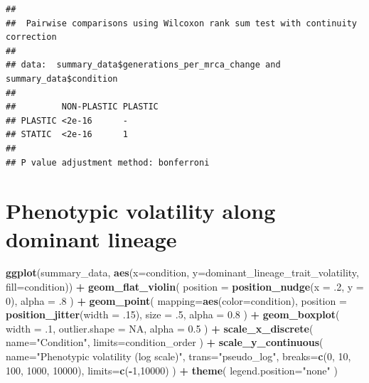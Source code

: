 \documentclass[]{book}
\newenvironment{Shaded}{\begin{snugshade}}{\end{snugshade}}
\newcommand{\DataTypeTok}[1]{\textcolor[rgb]{0.13,0.29,0.53}{#1}}
\newcommand{\DecValTok}[1]{\textcolor[rgb]{0.00,0.00,0.81}{#1}}
\newcommand{\FloatTok}[1]{\textcolor[rgb]{0.00,0.00,0.81}{#1}}
\newcommand{\KeywordTok}[1]{\textcolor[rgb]{0.13,0.29,0.53}{\textbf{#1}}}
\newcommand{\NormalTok}[1]{#1}
\newcommand{\OperatorTok}[1]{\textcolor[rgb]{0.81,0.36,0.00}{\textbf{#1}}}
\newcommand{\OtherTok}[1]{\textcolor[rgb]{0.56,0.35,0.01}{#1}}
\newcommand{\StringTok}[1]{\textcolor[rgb]{0.31,0.60,0.02}{#1}}
\begin{document}
\begin{verbatim}
## 
##  Pairwise comparisons using Wilcoxon rank sum test with continuity correction 
## 
## data:  summary_data$generations_per_mrca_change and summary_data$condition 
## 
##         NON-PLASTIC PLASTIC
## PLASTIC <2e-16      -      
## STATIC  <2e-16      1      
## 
## P value adjustment method: bonferroni
\end{verbatim}

\hypertarget{phenotypic-volatility-along-dominant-lineage}{%
\section{Phenotypic volatility along dominant lineage}\label{phenotypic-volatility-along-dominant-lineage}}

\begin{Shaded}
\begin{Highlighting}[]
\KeywordTok{ggplot}\NormalTok{(summary_data, }\KeywordTok{aes}\NormalTok{(}\DataTypeTok{x=}\NormalTok{condition, }\DataTypeTok{y=}\NormalTok{dominant_lineage_trait_volatility, }\DataTypeTok{fill=}\NormalTok{condition)) }\OperatorTok{+}
\StringTok{  }\KeywordTok{geom_flat_violin}\NormalTok{(}
    \DataTypeTok{position =} \KeywordTok{position_nudge}\NormalTok{(}\DataTypeTok{x =} \FloatTok{.2}\NormalTok{, }\DataTypeTok{y =} \DecValTok{0}\NormalTok{),}
    \DataTypeTok{alpha =} \FloatTok{.8}
\NormalTok{  ) }\OperatorTok{+}
\StringTok{  }\KeywordTok{geom_point}\NormalTok{(}
    \DataTypeTok{mapping=}\KeywordTok{aes}\NormalTok{(}\DataTypeTok{color=}\NormalTok{condition),}
    \DataTypeTok{position =} \KeywordTok{position_jitter}\NormalTok{(}\DataTypeTok{width =} \FloatTok{.15}\NormalTok{),}
    \DataTypeTok{size =} \FloatTok{.5}\NormalTok{,}
    \DataTypeTok{alpha =} \FloatTok{0.8}
\NormalTok{  ) }\OperatorTok{+}
\StringTok{  }\KeywordTok{geom_boxplot}\NormalTok{(}
    \DataTypeTok{width =} \FloatTok{.1}\NormalTok{,}
    \DataTypeTok{outlier.shape =} \OtherTok{NA}\NormalTok{,}
    \DataTypeTok{alpha =} \FloatTok{0.5}
\NormalTok{  ) }\OperatorTok{+}
\StringTok{  }\KeywordTok{scale_x_discrete}\NormalTok{(}
    \DataTypeTok{name=}\StringTok{"Condition"}\NormalTok{,}
    \DataTypeTok{limits=}\NormalTok{condition_order}
\NormalTok{  ) }\OperatorTok{+}
\StringTok{  }\KeywordTok{scale_y_continuous}\NormalTok{(}
    \DataTypeTok{name=}\StringTok{"Phenotypic volatility (log scale)"}\NormalTok{,}
    \DataTypeTok{trans=}\StringTok{"pseudo_log"}\NormalTok{,}
    \DataTypeTok{breaks=}\KeywordTok{c}\NormalTok{(}\DecValTok{0}\NormalTok{, }\DecValTok{10}\NormalTok{, }\DecValTok{100}\NormalTok{, }\DecValTok{1000}\NormalTok{, }\DecValTok{10000}\NormalTok{),}
    \DataTypeTok{limits=}\KeywordTok{c}\NormalTok{(}\OperatorTok{-}\DecValTok{1}\NormalTok{,}\DecValTok{10000}\NormalTok{)}
\NormalTok{  ) }\OperatorTok{+}
\StringTok{  }\KeywordTok{theme}\NormalTok{(}
    \DataTypeTok{legend.position=}\StringTok{"none"}
\NormalTok{  )}
\end{Highlighting}
\end{Shaded}
\end{document}
